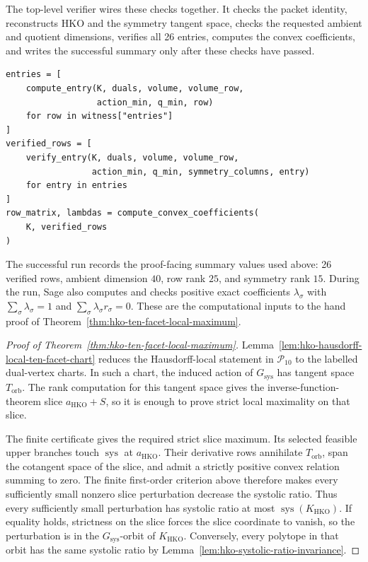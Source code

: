 The top-level verifier wires these checks together. It checks the packet
identity, reconstructs HKO and the symmetry tangent space, checks the requested
ambient and quotient dimensions, verifies all 26 entries, computes the convex
coefficients, and writes the successful summary only after these checks have
passed.

\begin{verbatim}
entries = [
    compute_entry(K, duals, volume, volume_row,
                  action_min, q_min, row)
    for row in witness["entries"]
]
verified_rows = [
    verify_entry(K, duals, volume, volume_row,
                 action_min, q_min, symmetry_columns, entry)
    for entry in entries
]
row_matrix, lambdas = compute_convex_coefficients(
    K, verified_rows
)
\end{verbatim}

The successful run records the proof-facing summary values used above: 26
verified rows, ambient dimension \(40\), row rank \(25\), and symmetry rank
\(15\). During the run, Sage also computes and checks positive exact
coefficients \(\lambda_\sigma\) with
\(\sum_\sigma \lambda_\sigma=1\) and
\(\sum_\sigma \lambda_\sigma r_\sigma=0\). These are the computational inputs
to the hand proof of Theorem~\ref{thm:hko-ten-facet-local-maximum}.

\begin{proof}[Proof of Theorem~\ref{thm:hko-ten-facet-local-maximum}]
Lemma~\ref{lem:hko-hausdorff-local-ten-facet-chart} reduces the Hausdorff-local
statement in \(\mathcal P_{10}\) to the labelled dual-vertex charts. In such a
chart, the induced action of \(G_{\operatorname{sys}}\) has tangent space
\(T_{\mathrm{orb}}\). The rank computation for this tangent space gives the
inverse-function-theorem slice \(a_{\mathrm{HKO}}+S\), so it is enough to prove
strict local maximality on that slice.

The finite certificate gives the required strict slice maximum. Its selected
feasible upper branches touch \(\operatorname{sys}\) at \(a_{\mathrm{HKO}}\).
Their derivative rows annihilate \(T_{\mathrm{orb}}\), span the cotangent space
of the slice, and admit a strictly positive convex relation summing to zero.
The finite first-order criterion above therefore makes every sufficiently small
nonzero slice perturbation decrease the systolic ratio. Thus every sufficiently
small perturbation has systolic ratio at most
\(\operatorname{sys}(K_{\mathrm{HKO}})\). If equality holds, strictness on the
slice forces the slice coordinate to vanish, so the perturbation is in the
\(G_{\operatorname{sys}}\)-orbit of \(K_{\mathrm{HKO}}\). Conversely, every
polytope in that orbit has the same systolic ratio by
Lemma~\ref{lem:hko-systolic-ratio-invariance}.
\end{proof}

